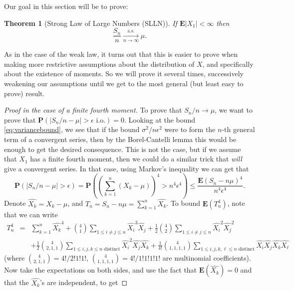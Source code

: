 \documentclass[12pt]{article}
\newtheorem{thm}{Theorem}[section]
\newcommand{\prob}{\mathbf{P}}
\newcommand{\expec}{\mathbf{E}}
\theoremstyle{example}
\begin{document}
Our goal in this section will be to prove:

\begin{thm}[Strong Law of Large Numbers (SLLN)] If $\expec|X_1|<\infty$ then
$$
\frac{S_n}{n} \xrightarrow[n\to\infty]{\textrm{a.s.}} \mu.
$$
\label{thm-slln}
\end{thm}

As in the case of the weak law, it turns out that this is easier to prove when making more restrictive assumptions about the distribution of $X$, and specifically about the existence of moments. So we will prove it several times, successively weakening our assumptions until we get to the most general (but least easy to prove) result.

\begin{proof}[Proof in the case of a finite fourth moment] To prove that $S_n/n\to \mu$, we want to prove that $\prob(|S_n/n-\mu|>\epsilon\textrm{ i.o.})=0$. Looking at the bound \eqref{eq:variancebound}, we see that if the bound $\sigma^2/n\epsilon^2$ were to form the $n$-th general term of a convergent series, then by the Borel-Cantelli lemma this would be enough to get the desired consequence. This is not the case, but if we assume that $X_1$ has a finite fourth moment, then we could do a similar trick that \emph{will} give a convergent series. In that case, using Markov's inequality we can get that
\begin{equation} \label{eq:previousbound}
\prob(|S_n/n-\mu|>\epsilon) = \prob\left(\left( \sum_{k=1}^n (X_k-\mu) \right)^4 > n^4 \epsilon^4\right)
\le \frac{\expec(S_n-n\mu)^4}{n^4 \epsilon^4}.
\end{equation}
Denote $\hat{X_k}=X_k-\mu$, and $T_n = S_n-n\mu= \sum_{k=1}^n \hat{X_k}$. To bound $\expec(T_n^4)$, note that we can write
\begin{eqnarray*} T_n^4 &=& \sum_{k=1}^n \hat{X_k}^4 + \binom{4}{1} \sum_{1 \le i\neq j \le n} \hat{X_i}^3 \hat{X_j}
+ \frac12\binom{4}{2}\sum_{1 \le i\neq j \le n} \hat{X_i}^2 \hat{X_j}^2
\\ & & + \frac12\binom{4}{2,1,1} \sum_{1\le i,j,k \le n\textrm{ distinct}} \hat{X_i}^2 \hat{X_j} \hat{X_k}
+ \frac{1}{4!}\binom{4}{1,1,1,1} \sum_{1 \le i,j,k,\ell \le n\textrm{ distinct}} \hat{X_i} \hat{X_j} \hat{X_k} \hat{X_\ell}
\end{eqnarray*}
(where $\binom{4}{2,1,1}=4!/2!1!1!$, $\binom{4}{1,1,1,1}=4!/1!1!1!1!$ are multinomial coefficients).
Now take the expectations on both sides, and use the fact that $\expec(\hat{X_k}) = 0$ and that the $\hat{X_k}$'s are independent, to get

\end{proof}
\end{document}
